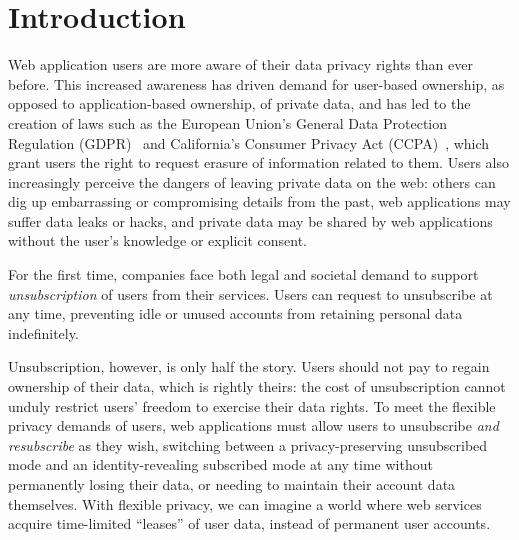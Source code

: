 \section{Introduction}

Web application users are more aware of their data privacy rights than ever before. 
%
This increased awareness has driven demand for user-based ownership, as opposed to application-based
ownership, of private data, and has led to the creation of laws such as the European Union's General
Data Protection Regulation (GDPR)~\cite{eu:gdpr} and California's Consumer Privacy Act
(CCPA)~\cite{ca:privacy-act}, which grant users the right to request erasure of information related
to them.
%
Users also increasingly perceive the dangers of leaving private data on the
web: others can dig up embarrassing or compromising details from the past, web applications may
suffer data leaks or hacks, and private data may be shared by web applications without the user's
knowledge or explicit consent.
%

%
For the first time, companies face both legal and societal demand to support \emph{unsubscription}
of users from their services. Users can request to unsubscribe at any time, preventing 
idle or unused accounts from retaining personal data indefinitely. 
%

%
Unsubscription, however, is only half the story. Users should not pay to regain ownership of their
data, which is rightly theirs: the cost of unsubscription cannot unduly restrict users' freedom to exercise their data
rights. To meet the flexible privacy demands of users, web applications must allow users to
unsubscribe \emph{and resubscribe} as they wish, switching between a privacy-preserving unsubscribed
mode and an identity-revealing subscribed mode at any time without permanently losing their data, or
needing to maintain their account data themselves. 
%
With flexible privacy, we can imagine a world where web services acquire time-limited ``leases'' of user
data, instead of permanent user accounts. 
%

